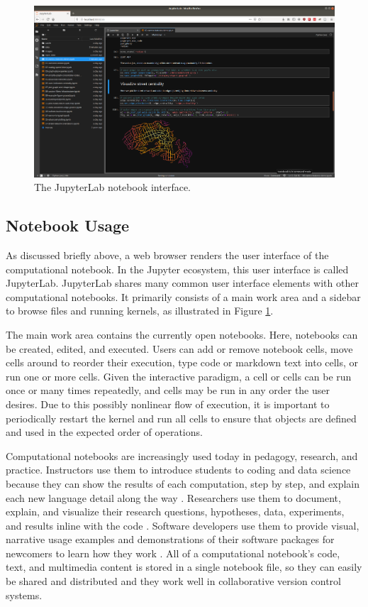 \documentclass[11pt,letterpaper]{article}
\begin{document}
\begin{figure}[tbp]
	\centering
	\includegraphics[width=1\textwidth]{jupyterlab-interface.png}
	\caption{The JupyterLab notebook interface.}
	\label{fig:jupyterlab_interface}
\end{figure}

\subsection{Notebook Usage}

As discussed briefly above, a web browser renders the user interface of the computational notebook. In the Jupyter ecosystem, this user interface is called JupyterLab. JupyterLab shares many common user interface elements with other computational notebooks. It primarily consists of a main work area and a sidebar to browse files and running kernels, as illustrated in Figure \ref{fig:jupyterlab_interface}. 

The main work area contains the currently open notebooks. Here, notebooks can be created, edited, and executed. Users can add or remove notebook cells, move cells around to reorder their execution, type code or markdown text into cells, or run one or more cells. Given the interactive paradigm, a cell or cells can be run once or many times repeatedly, and cells may be run in any order the user desires. Due to this possibly nonlinear flow of execution, it is important to periodically restart the kernel and run all cells to ensure that objects are defined and used in the expected order of operations.

Computational notebooks are increasingly used today in pedagogy, research, and practice. Instructors use them to introduce students to coding and data science because they can show the results of each computation, step by step, and explain each new language detail along the way \citep{reades_teaching_2020}. Researchers use them to document, explain, and visualize their research questions, hypotheses, data, experiments, and results inline with the code \citep{perkel_why_2018}. Software developers use them to provide visual, narrative usage examples and demonstrations of their software packages for newcomers to learn how they work \citep{boeing_urban_2020}. All of a computational notebook's code, text, and multimedia content is stored in a single notebook file, so they can easily be shared and distributed and they work well in collaborative version control systems.
\end{document}

